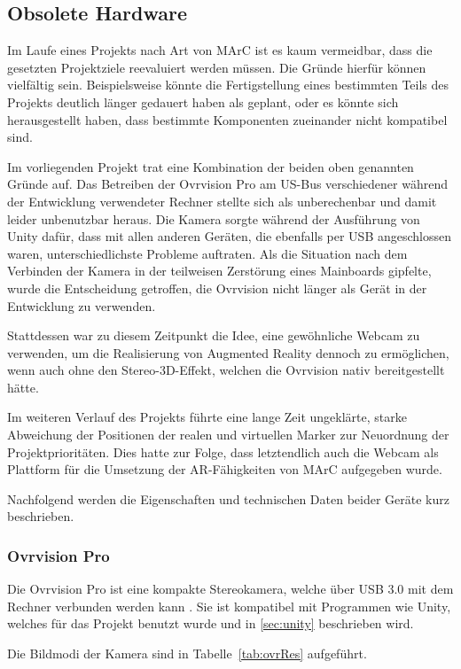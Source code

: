 	
\subsection{Obsolete Hardware}\label{sec:obsoleteHardware}
Im Laufe eines Projekts nach Art von MArC ist es kaum vermeidbar, dass die gesetzten Projektziele reevaluiert werden müssen. Die Gründe hierfür können vielfältig sein. Beispielsweise könnte die Fertigstellung eines bestimmten Teils des Projekts deutlich länger gedauert haben als geplant, oder es könnte sich herausgestellt haben, dass bestimmte Komponenten zueinander nicht kompatibel sind.

Im vorliegenden Projekt trat eine Kombination der beiden oben genannten Gründe auf. Das Betreiben der Ovrvision Pro am US-Bus verschiedener während der Entwicklung verwendeter Rechner stellte sich als unberechenbar und damit leider unbenutzbar heraus. Die Kamera sorgte während der Ausführung von Unity dafür, dass mit allen anderen Geräten, die ebenfalls per USB angeschlossen waren, unterschiedlichste Probleme auftraten. Als die Situation nach dem Verbinden der Kamera in der teilweisen Zerstörung eines Mainboards gipfelte, wurde die Entscheidung getroffen, die Ovrvision nicht länger als Gerät in der Entwicklung zu verwenden.

Stattdessen war zu diesem Zeitpunkt die Idee, eine gewöhnliche Webcam zu verwenden, um die Realisierung von Augmented Reality dennoch zu ermöglichen, wenn auch ohne den Stereo-3D-Effekt, welchen die Ovrvision nativ bereitgestellt hätte.

Im weiteren Verlauf des Projekts führte eine lange Zeit ungeklärte, starke Abweichung der Positionen der realen und virtuellen Marker zur Neuordnung der Projektprioritäten. Dies hatte zur Folge, dass letztendlich auch die Webcam als Plattform für die Umsetzung der AR-Fähigkeiten von MArC aufgegeben wurde.

Nachfolgend werden die Eigenschaften und technischen Daten beider Geräte kurz beschrieben.
\subsubsection{Ovrvision Pro}\label{sec:ovrvision}
Die Ovrvision Pro ist eine kompakte Stereokamera, welche über USB 3.0 mit dem Rechner verbunden werden kann \cite{website:ovrvision}. Sie ist kompatibel mit Programmen wie Unity, welches für das Projekt benutzt wurde und in \ref{sec:unity} beschrieben wird.

Die Bildmodi der Kamera sind in Tabelle~\ref{tab:ovrRes} aufgeführt.

